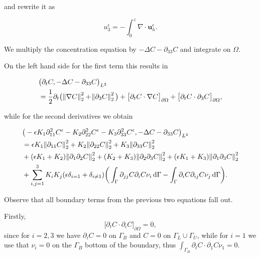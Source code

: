 \documentclass[11pt]{article}
\newcommand*\diff{\mathop{}\!\mathrm{d}}
\begin{document}
and rewrite it as

$$ u^\epsilon_3 = - \int_0^z \nabla \cdot \mathbf{u}^\epsilon_h.$$

We multiply the concentration equation by $-\Delta C - \partial_{33} C$ and integrate on $\Omega.$

On the left hand side for the first term this results in 

\begin{equation}
  \begin{split}
  & \big ( \partial_t C, -\Delta C -\partial_{33} C \big) _{L^2} \\
  & = \frac{1}{2} \partial_t \big ( \norm{\nabla C}_2^2 + \norm{\partial_3 C}_2^2 \big) + \big \lbrack \partial_t C \cdot \nabla C \big \rbrack_{\partial \Omega} + \big \lbrack \partial_t C \cdot \partial_3 C \big \rbrack_{\partial \Omega},
  \end{split}
\end{equation}

while for the second derivatives we obtain

\begin{equation}
  \begin{split}
  & \big ( - \epsilon K_1 \partial_{11} ^ 2 C^\epsilon - K_2 \partial_{22} ^ 2 C^\epsilon - K_3 \partial_{33} ^ 2 C^\epsilon, -\Delta C -\partial_{33} C \big) _{L^2} \\
  & = \epsilon K_1 \norm{\partial_{11} C}^2_2 + K_2 \norm{\partial_{22} C}^2_2 + K_3 \norm{\partial_{33} C}^2_2 \\
  & + (\epsilon K_1 + K_2) \norm{\partial_1 \partial_2 C}_2^2 + (K_2 + K_3) \norm{\partial_2 \partial_3 C}_2^2 + (\epsilon K_1 + K_3) \norm{\partial_1 \partial_3 C}_2^2 \\
  & + \sum_{i,j = 1}^3 K_i K_j (\epsilon \delta_{i=1} + \delta_{i \neq 1}) \bigg (\int_\Gamma \partial_{jj} C \partial_i C \nu_i \diff \Gamma - \int_\Gamma \partial_i C \partial_{ij} C \nu_j \diff \Gamma \bigg ).
  \end{split}
\end{equation}

Observe that all boundary terms from the previous two equations fall out.

Firstly, 
$$\big \lbrack \partial_t C \cdot \partial_i C \big \rbrack_{\partial \Omega} = 0,$$ since for $i = 2,3$ we have $\partial_i C = 0$ on $\Gamma_B$ and $C=0$ on $\Gamma_L \cup \Gamma_U$, while for $i=1$ we use that $\nu_i = 0$ on the $\Gamma_B$ bottom of the boundary, thus $\int_{\Gamma_B} \partial_t C \cdot \partial_1 C \nu_1 = 0.$
\end{document}
